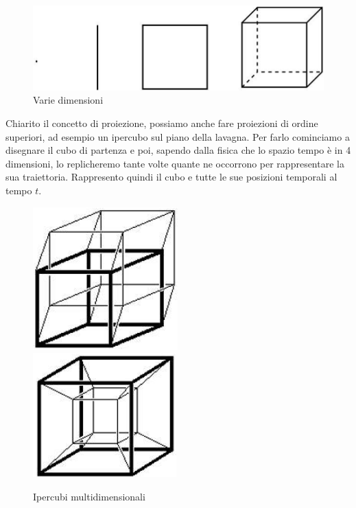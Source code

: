 \begin{center}
\begin{figure}[H]
\centering
\includegraphics[scale=1]{figures/dimensions.png}
\caption{Varie dimensioni}
\end{figure}
\end{center}

Chiarito il concetto di proiezione, possiamo anche fare proiezioni di ordine superiori, ad esempio un ipercubo sul piano della lavagna. Per farlo cominciamo a disegnare il cubo di partenza e poi, sapendo dalla fisica che lo spazio tempo è in 4 dimensioni, lo replicheremo tante volte quante ne occorrono per rappresentare la sua traiettoria. Rappresento quindi il cubo e tutte le sue posizioni temporali al tempo $t$.

\begin{center}
\begin{figure}[H]
\centering
\includegraphics[scale=1]{figures/hc1.png}
\includegraphics[scale=1]{figures/hc2.png}
\caption{Ipercubi multidimensionali}
\end{figure}
\end{center}

